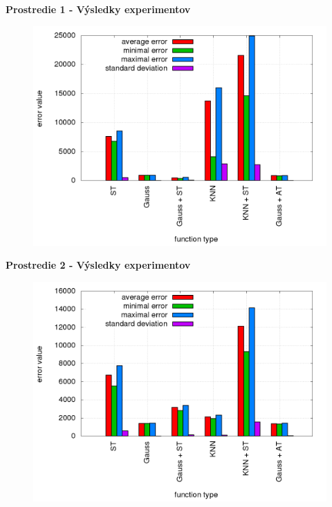 \documentclass[xcolor=dvipsnames]{beamer}
\begin{document}
\begin{frame}{\bf Prostredie 1 - Výsledky experimentov}

\begin{figure}[!htb]
\centering
\includegraphics[scale=.36]{../../results_q_learning/map_0/trials_average_results.png}
\end{figure}

\end{frame}

\begin{frame}{\bf Prostredie 2 - Výsledky experimentov}

\begin{figure}[!htb]
\centering
\includegraphics[scale=.36]{../../results_q_learning/map_2/trials_average_results.png}
\end{figure}

\end{frame}
\end{document}
